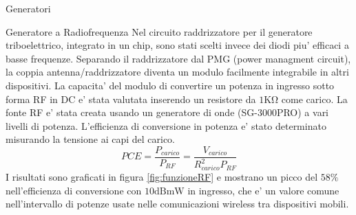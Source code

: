 \begin{section}{Generatori}
\begin{subsection}{Generatore a Radiofrequenza}
        Nel circuito raddrizzatore per il generatore triboelettrico, integrato in un chip, sono stati scelti invece dei diodi piu' efficaci a basse frequenze. Separando il raddrizzatore dal PMG (power managment circuit), la coppia antenna/raddrizzatore diventa un modulo facilmente integrabile in altri dispositivi. La capacita' del modulo di convertire un potenza in ingresso sotto forma RF in DC e' stata valutata inserendo un resistore da \(1\mathrm{K\Omega}\) come carico. La fonte RF e' stata creata usando un generatore di onde (SG-3000PRO) a vari livelli di potenza. L'efficienza di conversione in potenza e' stato determinato misurando la tensione ai capi del carico. 
        \begin{equation*}
            PCE = \frac{P_{carico}}{P_{RF}} = \frac{V_{carico}}{R_{carico}^2P_{RF}}
        \end{equation*}
        I risultati sono graficati in figura \ref{fig:funzioneRF} e mostrano un picco del \(58\%\) nell'efficienza di conversione con \(10\mathrm{dBmW}\) in ingresso, che e' un valore comune nell'intervallo di potenze usate nelle comunicazioni wireless tra dispositivi mobili. 
    \end{subsection}
\end{section}

